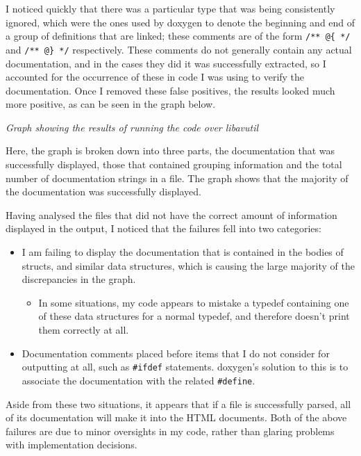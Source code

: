 I noticed quickly that there was a particular type that was being consistently
ignored, which were the ones used by doxygen to denote the beginning and end of
a group of definitions that are linked; these comments are of the form
\lstinline|/** @{ */| and \lstinline|/** @} */| respectively. These comments
do not generally contain any actual documentation, and in the cases they did
it was successfully extracted, so I accounted for the occurrence of these in
code I was using to verify the documentation. Once I removed these false
positives, the results looked much more positive, as can be seen in the graph
below.

\noindent{}
\begin{center}
  \emph{Graph showing the results of running the code over libavutil}
\end{center}

Here, the graph is broken down into three parts, the documentation that was
successfully displayed, those that contained grouping information and the total
number of documentation strings in a file. The graph shows that the majority
of the documentation was successfully displayed.

Having analysed the files that did not have the correct amount of information
displayed in the output, I noticed that the failures fell into two categories:
\begin{itemize}
  \item I am failing to display the documentation that is contained in the
    bodies of structs, and similar data structures, which is causing the large
    majority of the discrepancies in the graph.
    \begin{itemize}
      \item In some situations, my code appears to mistake a typedef
      containing one of these data structures for a normal typedef, and
      therefore doesn't print them correctly at all.
    \end{itemize}
  \item Documentation comments placed before items that I do not consider for
    outputting at all, such as \lstinline|#ifdef| statements. doxygen's
    solution to this is to associate the documentation with the related
    \lstinline|#define|.
\end{itemize}

Aside from these two situations, it appears that if a file is successfully
parsed, all of its documentation will make it into the HTML documents. Both of
the above failures are due to minor oversights in my code, rather than glaring
problems with implementation decisions.

